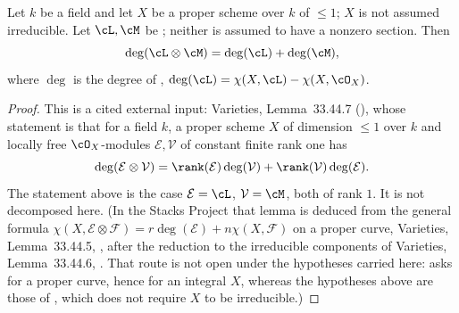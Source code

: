 \begin{lemma}
\label{lem:pc-degree-tensor-additive}
Let $k$ be a field and let $X$ be a proper scheme over $k$ of
 $\le1$; $X$ is not assumed
irreducible.  Let $\cL,\cM$ be
; neither
is assumed to have a nonzero section.  Then
\[
\deg(\cL\otimes\cM)=\deg(\cL)+\deg(\cM),
\]
where $\deg$ is the degree of ,
$\deg(\cL)=\chi(X,\cL)-\chi(X,\cO_X)$.
\end{lemma}
\begin{proof}
This is a cited external input: Varieties, Lemma~33.44.7
(), whose statement is that for a field $k$, a
proper scheme $X$ of dimension $\le1$ over $k$ and locally free
$\cO_X$-modules $\mathcal E,\mathcal V$ of constant finite rank one has
\[
\deg(\mathcal E\otimes\mathcal V)
=\rank(\mathcal E)\deg(\mathcal V)+\rank(\mathcal V)\deg(\mathcal E).
\]
The statement above is the case $\mathcal E=\cL$, $\mathcal V=\cM$, both
of rank $1$.  It is not decomposed here.  (In the Stacks Project that
lemma is deduced from the general formula
$\chi(X,\mathcal E\otimes\mathcal F)=r\deg(\mathcal E)+n\chi(X,\mathcal F)$
on a proper curve, Varieties, Lemma~33.44.5, ,
after the reduction to the irreducible components of Varieties,
Lemma~33.44.6, .  That route is not open under the
hypotheses carried here:  asks for a proper curve,
hence for an integral $X$, whereas the hypotheses above are those of
, which does not require $X$ to be irreducible.)
\end{proof}

